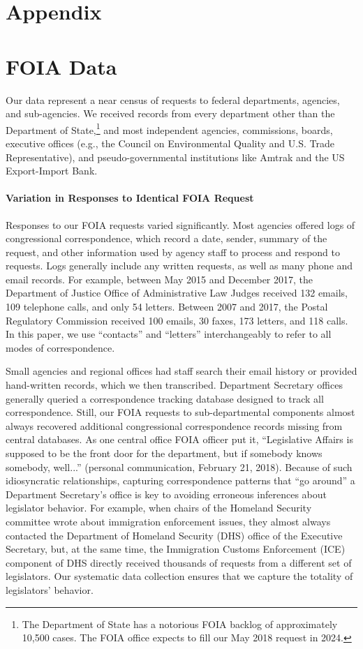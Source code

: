 
\section*{Appendix}


\section{FOIA Data}

Our data represent a near census of requests to federal departments, agencies, and sub-agencies. We received records from every department other than the Department of State,\footnote{The Department of State has a notorious FOIA backlog of approximately 10,500 cases. The FOIA office expects to fill our May 2018 request in 2024.} 
and most independent agencies, commissions, boards, executive offices (e.g., the Council on Environmental Quality and U.S. Trade Representative), and pseudo-governmental institutions like Amtrak and the US Export-Import Bank. 

\paragraph{Variation in Responses to Identical FOIA Request} Responses to our FOIA requests varied significantly. Most agencies offered logs of congressional correspondence, which record a date, sender, summary of the request, and other information used by agency staff to process and respond to requests. Logs generally include any written requests, as well as many phone and email records. For example, between May 2015 and December 2017, the Department of Justice Office of Administrative Law Judges received 132 emails, 109 telephone calls, and only 54 letters. Between 2007 and 2017, the Postal Regulatory Commission received 100 emails, 30 faxes, 173 letters, and 118 calls. In this paper, we use ``contacts'' and ``letters'' interchangeably to refer to all modes of correspondence. 

Small agencies and regional offices had staff search their email history or provided hand-written records, which we then transcribed. Department Secretary offices generally queried a correspondence tracking database designed to track all correspondence. Still, our FOIA requests to sub-departmental components almost always recovered additional congressional correspondence records missing from central databases. As one central office FOIA officer put it, ``Legislative Affairs is supposed to be the front door for the department, but if somebody knows somebody, well...'' (personal communication, February 21, 2018). Because of such idiosyncratic relationships, capturing correspondence patterns that ``go around'' a Department Secretary's office is key to avoiding erroneous inferences about legislator behavior. For example, when chairs of the Homeland Security committee wrote about immigration enforcement issues, they almost always contacted the Department of Homeland Security (DHS) office of the Executive Secretary, but, at the same time, the Immigration Customs Enforcement (ICE) component of DHS directly received thousands of requests from a different set of legislators. Our systematic data collection ensures that we capture the totality of legislators' behavior.

